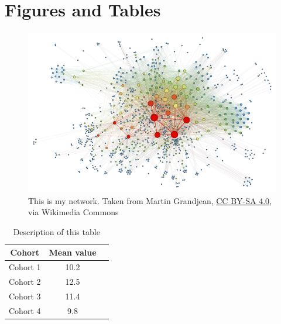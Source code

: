 \documentclass[11pt,onecolumn,letterpaper]{article}
\begin{document}
\section{Figures and Tables}
\label{Sec:figs}

\begin{figure}
    \centering
    \includegraphics[width=\textwidth]{SocialNetworkAnalysis.png}
    \caption{This is my network. Taken from Martin Grandjean, \href{https://creativecommons.org/licenses/by-sa/4.0}{CC BY-SA 4.0}, via Wikimedia Commons}
\end{figure}

\begin{table}[h]
\centering
\begin{tabular}{ccc}
\toprule
Cohort & Mean value \\
\midrule
Cohort 1 & 10.2 \\
Cohort 2 & 12.5 \\
Cohort 3 & 11.4 \\
Cohort 4 & 9.8 \\
\bottomrule
\end{tabular}
\caption{Description of this table}
\label{table:tab1}
\end{table}
\end{document}
